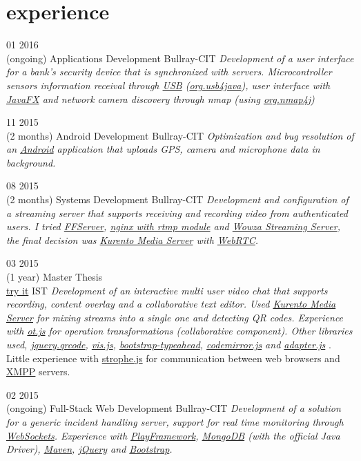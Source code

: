 \documentclass[]{friggeri-cv}
\begin{document}
\section{experience}


\begin{entrylist}

  \entry
    {01 2016\\(ongoing)}
    {Applications Development}
    {Bullray-CIT}
    {\emph{Development of a user interface for a bank's security device that is synchronized with servers. Microcontroller sensors information receival through \underline{USB} (\underline{org.usb4java}), user interface with \underline{JavaFX} and network camera discovery through nmap (using \underline{org.nmap4j}) } }

 \entry
    {11 2015\\(2 months)}
    {Android Development}
    {Bullray-CIT}
    {\emph{Optimization and bug resolution of an \underline{Android} application that uploads GPS, camera and microphone data in background.}}
 

\entry
    {08 2015\\(2 months)}
    {Systems Development}
    {Bullray-CIT}
    {\emph{Development and configuration of a streaming server that supports receiving and recording video from authenticated users. I tried \underline{FFServer}, \underline{nginx with rtmp module} and \underline{Wowza Streaming Server}, the final decision was \underline{Kurento Media Server} with \underline{WebRTC}. }}

\entry
    {03 2015\\(1 year)}
    {Master Thesis \\\href{https://citysdk.tagus.ist.utl.pt:9443/}{try it}}
    {IST}
    {\emph{Development of an interactive multi user video chat that supports recording, content overlay and a collaborative text editor. Used \underline{Kurento Media Server} for mixing streams into a single one and detecting QR codes. Experience with \underline{ot.js} for operation transformations (collaborative component). Other libraries used, \underline{jquery.qrcode}, \underline{vis.js}, \underline{bootstrap-typeahead}, \underline{codemirror.js} and \underline{adapter.js} }. Little experience with \underline{strophe.js} for communication between web browsers and \underline{XMPP} servers. }
    
  \entry
    {02 2015\\(ongoing)}
    {Full-Stack Web Development}
    {Bullray-CIT}
    {\emph{Development of a solution for a generic incident handling server, support for real time monitoring through \underline{WebSockets}. Experience with \underline{PlayFramework}, \underline{MongoDB} (with the official Java Driver), \underline{Maven}, \underline{jQuery} and \underline{Bootstrap}.}}
    

\end{entrylist}
\end{document}
